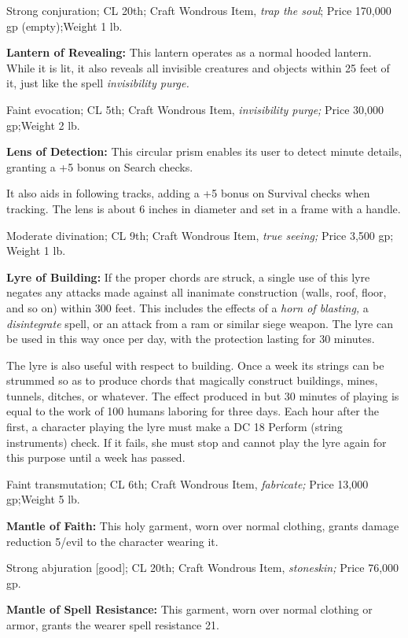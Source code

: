 Strong conjuration; CL 20th; Craft Wondrous Item, \textit{trap the soul}; Price 
170,000 gp (empty);Weight 1 lb.

\textbf{Lantern of Revealing:} This lantern operates as a normal hooded lantern. 
While it is lit, it also reveals all invisible creatures and objects within 25 
feet of it, just like the spell \textit{invisibility purge.}

Faint evocation; CL 5th; Craft Wondrous Item, \textit{invisibility purge; }Price 
30,000 gp;Weight 2 lb.

\textbf{Lens of Detection: }This circular prism enables its user to detect minute 
details, granting a +5 bonus on Search checks.

It also aids in following tracks, adding a +5 bonus on Survival checks when tracking. 
The lens is about 6 inches in diameter and set in a frame with a handle.

Moderate divination; CL 9th; Craft Wondrous Item, \textit{true seeing; }Price 3,500 
gp; Weight 1 lb.

\textbf{Lyre of Building: }If the proper chords are struck, a single use of this 
lyre negates any attacks made against all inanimate construction (walls, roof, 
floor, and so on) within 300 feet. This includes the effects of a \textit{horn 
of blasting, }a \textit{disintegrate }spell, or an attack from a ram or similar 
siege weapon. The lyre can be used in this way once per day, with the protection 
lasting for 30 minutes.

The lyre is also useful with respect to building. Once a week its strings can be 
strummed so as to produce chords that magically construct buildings, mines, tunnels, 
ditches, or whatever. The effect produced in but 30 minutes of playing is equal 
to the work of 100 humans laboring for three days. Each hour after the first, a 
character playing the lyre must make a DC 18 Perform (string instruments) check. 
If it fails, she must stop and cannot play the lyre again for this purpose until 
a week has passed.

Faint transmutation; CL 6th; Craft Wondrous Item, \textit{fabricate; }Price 13,000 
gp;Weight 5 lb.

\textbf{Mantle of Faith:} This holy garment, worn over normal clothing, grants 
damage reduction 5/evil to the character wearing it.

Strong abjuration [good]; CL 20th; Craft Wondrous Item, \textit{stoneskin; }Price 
76,000 gp.

\textbf{Mantle of Spell Resistance:} This garment, worn over normal clothing or 
armor, grants the wearer spell resistance 21.

